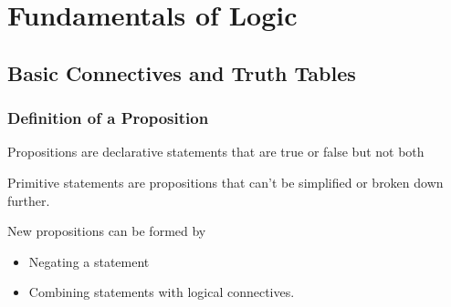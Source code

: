 \documentclass[../../../main.tex]{subfiles}
\begin{document}
\chapter{Fundamentals of Logic}
\label{chap:logic}

\section{Basic Connectives and Truth Tables}

\subsection{Definition of a Proposition}

\begin{definition}[Propositions]
Propositions are declarative statements that are true or false but not both
\end{definition}
    
\begin{definition}[Primitives]
Primitive statements are propositions that can't be simplified or broken down further.
\end{definition}

New propositions can be formed by
\begin{itemize}
    \item Negating a statement
    \item Combining statements with logical connectives.
\end{itemize}
\end{document}
